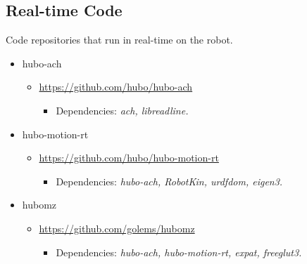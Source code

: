 \documentclass[letterpaper, 10 pt]{report}
\begin{document}
\subsection{Real-time Code}
Code repositories that run in real-time on the robot.
\begin{itemize}
\item hubo-ach
  \begin{itemize}
	\item \url{https://github.com/hubo/hubo-ach}
	  \begin{itemize}
	    \item Dependencies: \textit{ach, libreadline.}
	  \end{itemize}
  \end{itemize}
\item hubo-motion-rt
	\begin{itemize}
	\item \url{https://github.com/hubo/hubo-motion-rt}
	  \begin{itemize}
	    \item Dependencies: \textit{hubo-ach, RobotKin, urdfdom, eigen3.}
	  \end{itemize}
  \end{itemize}
\item hubomz
  \begin{itemize}
	\item \url{https://github.com/golems/hubomz}
	  \begin{itemize}
	    \item Dependencies: \textit{hubo-ach, hubo-motion-rt, expat, freeglut3.} 
	  \end{itemize}
  \end{itemize}
\end{itemize}
\end{document}
